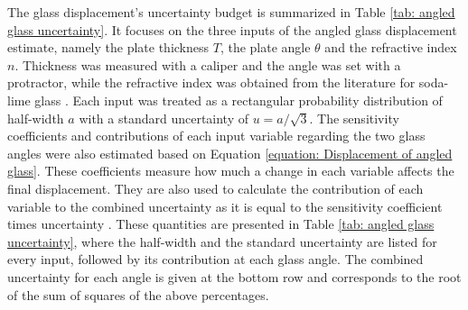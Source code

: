The glass displacement's uncertainty budget is summarized in Table \ref{tab: angled glass uncertainty}. It focuses on the three inputs of the angled glass displacement estimate, namely the plate thickness $T$, the plate angle $\theta$ and the refractive index $n$. Thickness was measured with a caliper and the angle was set with a protractor, while the refractive index was obtained from the literature for soda-lime glass \cite{Rubin1985}. Each input was treated as a rectangular probability distribution of half-width $a$ with a standard uncertainty of $u = a/\sqrt{3}$. The sensitivity coefficients and contributions of each input variable regarding the two glass angles were also estimated based on Equation \ref{equation: Displacement of angled glass}. These coefficients measure how much a change in each variable affects the final displacement. They are also used to calculate the contribution of each variable to the combined uncertainty as it is equal to the sensitivity coefficient times uncertainty \cite{JCGM2008}. These quantities are presented in Table \ref{tab: angled glass uncertainty}, where the half-width and the standard uncertainty are listed for every input, followed by its contribution at each glass angle. The combined uncertainty for each angle is given at the bottom row and corresponds to the root of the sum of squares of the above percentages.

